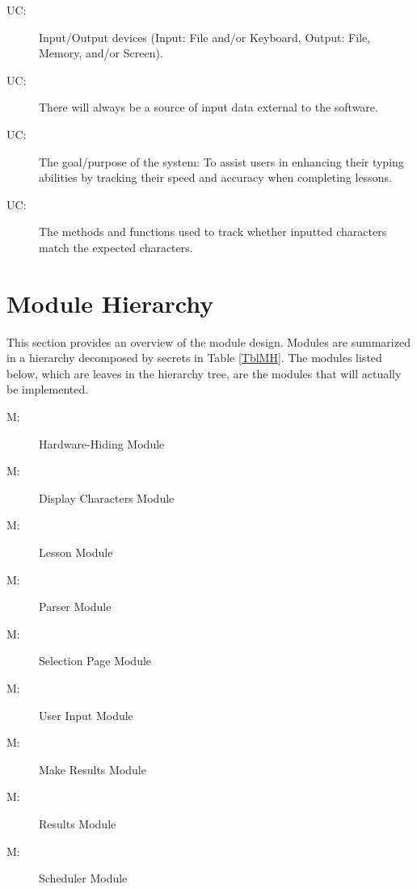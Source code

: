 \documentclass[12pt, titlepage]{article}
\newcounter{ucnum}
\newcommand{\uctheucnum}{UC\theucnum}
\newcounter{mnum}
\newcommand{\mthemnum}{M\themnum}
\begin{document}
\begin{description}
\item[ \uctheucnum \label{ucIO}:] Input/Output devices (Input: File and/or Keyboard, Output: File, Memory, and/or Screen).
\item[ \uctheucnum \label{ucInput}:] There will always be a source of input data external to the software.
\item[ \uctheucnum \label{ucInput}:] The goal/purpose of the system: To assist users in enhancing their typing abilities by tracking their speed and accuracy when completing lessons. 
\item[ \uctheucnum \label{ucInput}:] The methods and functions used to track whether inputted characters match the expected characters. 
\end{description}

\section{Module Hierarchy} \label{SecMH}

This section provides an overview of the module design. Modules are summarized
in a hierarchy decomposed by secrets in Table \ref{TblMH}. The modules listed
below, which are leaves in the hierarchy tree, are the modules that will
actually be implemented.

\begin{description}
\item [ \mthemnum \label{mHH}:] Hardware-Hiding Module
\item [ \mthemnum \label{mHH}:] Display Characters Module
\item [ \mthemnum \label{mHH}:] Lesson Module
\item [ \mthemnum \label{mHH}:] Parser Module
\item [ \mthemnum \label{mHH}:] Selection Page Module
\item [ \mthemnum \label{mHH}:] User Input Module
\item [ \mthemnum \label{mHH}:] Make Results Module
\item [ \mthemnum \label{mHH}:] Results Module
\item [ \mthemnum \label{mHH}:] Scheduler Module
\end{description}
\end{document}
